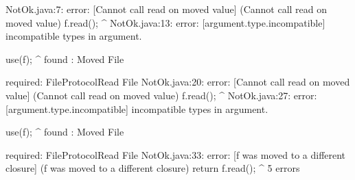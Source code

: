 \lstset{language=,caption=New Mungo output}
\begin{code}
NotOk.java:7: error: [Cannot call read on moved value] (Cannot call read on moved value)
    f.read();
          ^
NotOk.java:13: error: [argument.type.incompatible] incompatible types in argument.

    use(f);
        ^
  found   : Moved File

  required: FileProtocol{Read} File
NotOk.java:20: error: [Cannot call read on moved value] (Cannot call read on moved value)
    f.read();
          ^
NotOk.java:27: error: [argument.type.incompatible] incompatible types in argument.

    use(f);
        ^
  found   : Moved File

  required: FileProtocol{Read} File
NotOk.java:33: error: [f was moved to a different closure] (f was moved to a different closure)
      return f.read();
             ^
5 errors
\end{code}

